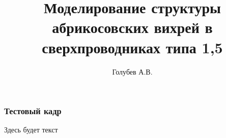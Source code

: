 \title{Моделирование структуры абрикосовских вихрей в сверхпроводниках 
    типа 1,5}
\author{Голубев А.В.}

\begin{frame}
    \titlepage
\end{frame}
\begin{frame}
    \frametitle{Тестовый кадр}
    Здесь будет текст
\end{frame}